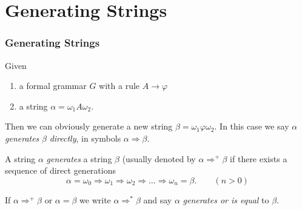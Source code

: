 \documentclass{beamer}
\theoremstyle{remark}
\newcommand{\directlygenerates}{\Rightarrow}
\newcommand{\generates}{\Rightarrow^{+}}
\newcommand{\generatesequal}{\Rightarrow^{*}}
\begin{document}
\section{Generating Strings}
\begin{frame}
	\frametitle{Generating Strings}
	\begin{definition}
		Given
		\begin{enumerate}
			\item a formal grammar $G$ with a rule $A \to \varphi$
			\item a string $\alpha = \omega_1A \omega_2$.
		\end{enumerate}
		Then we can obviously generate a new string $\beta = \omega_1\varphi \omega_2$. In this case
		we say $\alpha$ {\em generates} $\beta$ {\em directly}, in symbols $\alpha \directlygenerates \beta$.
	\end{definition}
	
	\pause

	\begin{definition}
		A string $\alpha$ {\em generates} a string $\beta$ (usually denoted by $\alpha \generates \beta$ if
		there exists a sequence of direct generations
		\begin{equation*}
			\alpha = \omega_0 \directlygenerates \omega_1 \directlygenerates \omega_2 \directlygenerates \ldots \directlygenerates \omega_n = \beta.  \qquad (n > 0)
		\end{equation*}
		
		If $\alpha \generates \beta$ or $\alpha = \beta$ we write $\alpha \generatesequal \beta$ and say $\alpha$ {\em generates or is equal} to
		$\beta$.
	\end{definition}
\end{frame}
\end{document}
